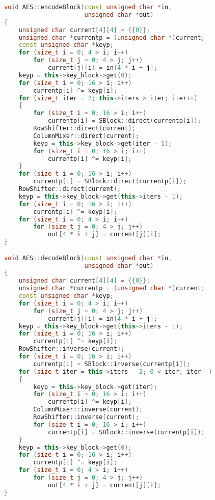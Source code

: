 \begin{lstlisting}[language=c++, caption={Класс, реализующий алгоритм AES}]
void AES::encodeBlock(const unsigned char *in,
                      unsigned char *out)
{
    unsigned char current[4][4] = {{0}};
    unsigned char *currentp = (unsigned char *)current;
    const unsigned char *keyp;
    for (size_t i = 0; 4 > i; i++)
        for (size_t j = 0; 4 > j; j++)
            current[j][i] = in[4 * i + j];
    keyp = this->key_block->get(0);
    for (size_t i = 0; 16 > i; i++)
        currentp[i] ^= keyp[i];
    for (size_t iter = 2; this->iters > iter; iter++)
    {
        for (size_t i = 0; 16 > i; i++)
            currentp[i] = SBlock::direct(currentp[i]);
        RowShifter::direct(current);
        ColumnMixer::direct(current);
        keyp = this->key_block->get(iter - 1);
        for (size_t i = 0; 16 > i; i++)
            currentp[i] ^= keyp[i];
    }
    for (size_t i = 0; 16 > i; i++)
        currentp[i] = SBlock::direct(currentp[i]);
    RowShifter::direct(current);
    keyp = this->key_block->get(this->iters - 1);
    for (size_t i = 0; 16 > i; i++)
        currentp[i] ^= keyp[i];
    for (size_t i = 0; 4 > i; i++)
        for (size_t j = 0; 4 > j; j++)
            out[4 * i + j] = current[j][i];
}

void AES::decodeBlock(const unsigned char *in,
                      unsigned char *out)
{
    unsigned char current[4][4] = {{0}};
    unsigned char *currentp = (unsigned char *)current;
    const unsigned char *keyp;
    for (size_t i = 0; 4 > i; i++)
        for (size_t j = 0; 4 > j; j++)
            current[j][i] = in[4 * i + j];
    keyp = this->key_block->get(this->iters - 1);
    for (size_t i = 0; 16 > i; i++)
        currentp[i] ^= keyp[i];
    RowShifter::inverse(current);
    for (size_t i = 0; 16 > i; i++)
        currentp[i] = SBlock::inverse(currentp[i]);
    for (size_t iter = this->iters - 2; 0 < iter; iter--)
    {
        keyp = this->key_block->get(iter);
        for (size_t i = 0; 16 > i; i++)
            currentp[i] ^= keyp[i];
        ColumnMixer::inverse(current);
        RowShifter::inverse(current);
        for (size_t i = 0; 16 > i; i++)
            currentp[i] = SBlock::inverse(currentp[i]);
    }
    keyp = this->key_block->get(0);
    for (size_t i = 0; 16 > i; i++)
        currentp[i] ^= keyp[i];
    for (size_t i = 0; 4 > i; i++)
        for (size_t j = 0; 4 > j; j++)
            out[4 * i + j] = current[j][i];
}
\end{lstlisting}

